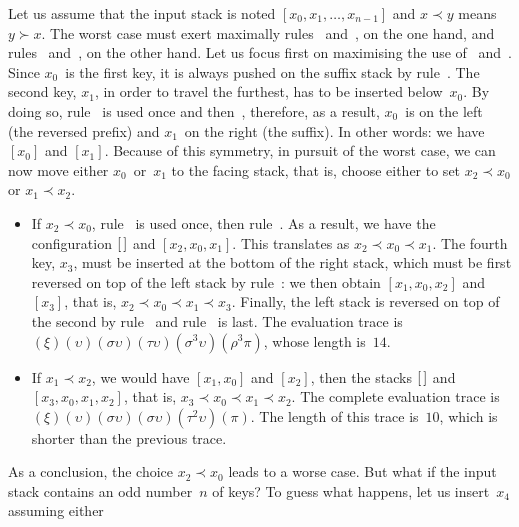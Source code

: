  Let us assume that
the input stack is noted \([x_0, x_1, \dots, x_{n-1}]\) and \(x \prec
y\) means \(y \succ x\). The worst case must exert maximally rules
\clause{\sigma}~and~\clause{\tau}, on the one hand, and rules
\clause{\pi}~and~\clause{\rho}, on the other hand. Let us focus first
on maximising the use of \clause{\sigma}~and~\clause{\tau}. Since
\(x_0\)~is the first key, it is always pushed on the suffix stack by
rule~\clause{\upsilon}. The second key, \(x_1\), in order to travel
the furthest, has to be inserted below~\(x_0\). By doing so,
rule~\clause{\sigma} is used once and then~\clause{\upsilon},
therefore, as a result, \(x_0\)~is on the left (the reversed prefix)
and \(x_1\)~on the right (the suffix). In other words: we have
\([x_0]\) and \([x_1]\). Because of this symmetry, in pursuit of the
worst case, we can now move either \(x_0\)~or~\(x_1\) to the facing
stack, that is, choose either to set \(x_2 \prec x_0\) or \(x_1 \prec
x_2\).
\begin{itemize}

\item If \(x_2 \prec x_0\), rule~\clause{\tau} is used once, then
  rule~\clause{\upsilon}. As a result, we have the configuration
  \([\,]\) and \([x_2, x_0, x_1]\). This translates as \(x_2 \prec x_0
  \prec x_1\). The fourth key, \(x_3\), must be inserted at the bottom
  of the right stack, which must be first reversed on top of the left
  stack by rule~\clause{\sigma}: we then obtain \([x_1, x_0, x_2]\)
  and \([x_3]\), that is, \(x_2 \prec x_0 \prec x_1 \prec
  x_3\). Finally, the left stack is reversed on top of the second by
  rule~\clause{\rho} and rule~\clause{\pi} is last. The evaluation
  trace is
  \((\xi)(\upsilon)(\sigma\upsilon)(\tau\upsilon)(\sigma^3\upsilon)
  (\rho^3\pi)\), whose length is~\(14\).

\item If \(x_1 \prec x_2\), we would have \([x_1, x_0]\) and
  \([x_2]\), then the stacks \([\,]\) and \([x_3, x_0, x_1, x_2]\),
  that is, \(x_3 \prec x_0 \prec x_1 \prec x_2\). The complete
  evaluation trace is
  \((\xi)(\upsilon)(\sigma\upsilon)(\sigma\upsilon)(\tau^2\upsilon)
  (\pi)\). The length of this trace is~\(10\), which is shorter than
  the previous trace.

\end{itemize}
As a conclusion, the choice \(x_2 \prec x_0\) leads to a worse
case. But what if the input stack contains an odd number~\(n\) of
keys? To guess what happens, let us insert~\(x_4\) assuming either
